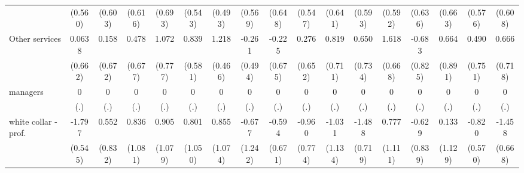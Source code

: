 {\begin{tabular}{l*{16}{c}}
                    &     (0.560)         &     (0.603)         &     (0.616)         &     (0.693)         &     (0.543)         &     (0.493)         &     (0.569)         &     (0.648)         &     (0.547)         &     (0.641)         &     (0.593)         &     (0.592)         &     (0.636)         &     (0.663)         &     (0.576)         &     (0.608)         \\
[1em]
Other services      &      0.0638         &       0.158         &       0.478         &       1.072         &       0.839         &       1.218\sym{**} &      -0.261         &      -0.225         &       0.276         &       0.819         &       0.650         &       1.618\sym{*}  &      -0.683         &       0.664         &       0.490         &       0.666         \\
                    &     (0.662)         &     (0.672)         &     (0.677)         &     (0.777)         &     (0.581)         &     (0.466)         &     (0.494)         &     (0.675)         &     (0.652)         &     (0.711)         &     (0.734)         &     (0.668)         &     (0.825)         &     (0.891)         &     (0.751)         &     (0.718)         \\
[1em]
managers            &           0         &           0         &           0         &           0         &           0         &           0         &           0         &           0         &           0         &           0         &           0         &           0         &           0         &           0         &           0         &           0         \\
                    &         (.)         &         (.)         &         (.)         &         (.)         &         (.)         &         (.)         &         (.)         &         (.)         &         (.)         &         (.)         &         (.)         &         (.)         &         (.)         &         (.)         &         (.)         &         (.)         \\
[1em]
white collar - prof.&      -1.797\sym{***}&       0.552         &       0.836         &       0.905         &       0.801         &       0.855         &      -0.677         &      -0.594         &      -0.960         &      -1.031         &      -1.488\sym{*}  &       0.777         &      -0.629         &       0.133         &      -0.820         &      -1.458\sym{*}  \\
                    &     (0.545)         &     (0.832)         &     (1.081)         &     (1.079)         &     (1.050)         &     (1.074)         &     (1.242)         &     (0.671)         &     (0.774)         &     (1.134)         &     (0.719)         &     (1.111)         &     (0.839)         &     (1.129)         &     (0.570)         &     (0.668)         \\

\end{tabular}}

